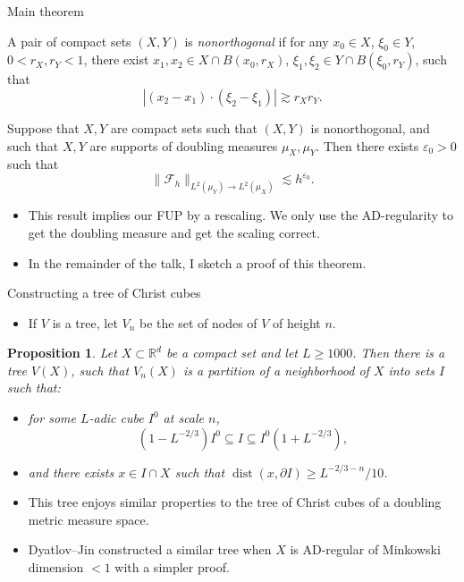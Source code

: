 \documentclass[10pt]{beamer}
\newcommand{\RR}{\mathbb{R}}
\DeclareMathOperator{\dist}{dist}
\newtheorem{proposition}{Proposition}
\begin{document}
\begin{frame}{Main theorem}
\begin{definition}
A pair of compact sets $(X, Y)$ is \emph{nonorthogonal} if for any $x_0 \in X$, $\xi_0 \in Y$, $0 < r_X, r_Y < 1$, there exist $x_1, x_2 \in X \cap B(x_0, r_X)$, $\xi_1, \xi_2 \in Y \cap B(\xi_0, r_Y)$, such that 
$$|(x_2 - x_1) \cdot (\xi_2 - \xi_1)| \gtrsim r_X r_Y.$$
\end{definition} \pause

\begin{theorem}
Suppose that $X, Y$ are compact sets such that $(X, Y)$ is nonorthogonal, and such that $X, Y$ are supports of doubling measures $\mu_X, \mu_Y$. Then there exists $\varepsilon_0 > 0$ such that 
$$\|\mathscr F_h\|_{L^2(\mu_Y) \to L^2(\mu_X)} \lesssim h^{\varepsilon_0}.$$
\end{theorem} \pause

\begin{itemize}
\item This result implies our FUP by a rescaling. We only use the AD-regularity to get the doubling measure and get the scaling correct. \pause
\item In the remainder of the talk, I sketch a proof of this theorem.
\end{itemize}
\end{frame}

\begin{frame}{Constructing a tree of Christ cubes}
\begin{itemize}
\item If $V$ is a tree, let $V_n$ be the set of nodes of $V$ of height $n$. \pause
\end{itemize}

\begin{proposition}
Let $X \subset \RR^d$ be a compact set and let $L \geq 1000$. Then there is a tree $V(X)$, such that $V_n(X)$ is a partition of a neighborhood of $X$ into sets $I$ such that:
\begin{itemize}
\item[(a)] for some $L$-adic cube $I^0$ at scale $n$, 
$$(1 - L^{-2/3}) I^0 \subseteq I \subseteq I^0(1 + L^{-2/3}),$$
\item[(b)] and there exists $x \in I \cap X$ such that $\dist(x, \partial I) \geq L^{-2/3-n}/10$.
\end{itemize}
\end{proposition} \pause

\begin{itemize}
\item This tree enjoys similar properties to the tree of Christ cubes of a doubling metric measure space. \pause
\item Dyatlov--Jin constructed a similar tree when $X$ is AD-regular of Minkowski dimension $< 1$ with a simpler proof.
\end{itemize}
\end{frame}
\end{document}
